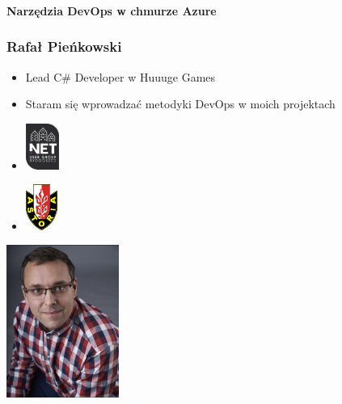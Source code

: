 \documentclass{beamer}
\begin{document}
\centering


\begin{frame}
\frametitle{\textbf{}}

\textbf{
	\Huge{Narzędzia DevOps }
    \vskip 3mm
    \Huge{ w chmurze Azure}
}

\end{frame}


\begin{frame}
\frametitle{\textbf{Rafał Pieńkowski}}

\begin{minipage}{0.45\textwidth}
\begin{center}
    \begin{itemize}
        \item Lead C\# Developer w Huuuge Games
        \item Staram się wprowadzać metodyki DevOps w moich projektach
        \item \vskip 2mm \hspace{10mm} \includegraphics[height=15mm]{logo.png}
        \item \vskip 2mm \hspace{10mm} \includegraphics[height=15mm]{astoria.png}
    \end{itemize}	
\end{center}
\end{minipage}
\begin{minipage}{0.45\textwidth}
    \hspace{15mm}
    \includegraphics[height=5cm]{me.png}
\end{minipage}

\end{frame}
\end{document}
